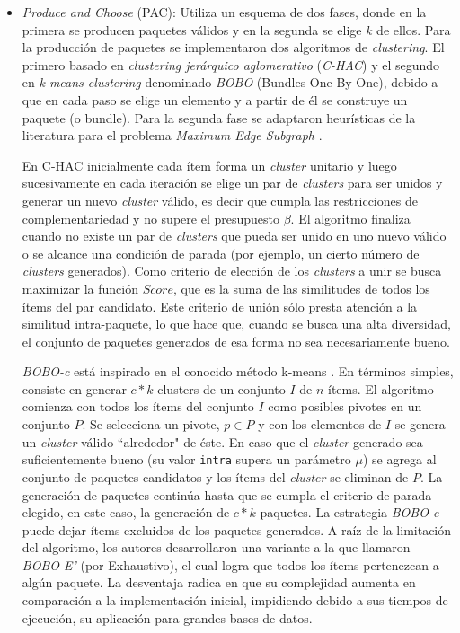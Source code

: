 \begin{itemize}

	\item {\em Produce and Choose} (PAC): Utiliza un esquema de dos fases, donde en la primera se producen paquetes válidos y en la segunda se elige $k$ de ellos. Para la producción de paquetes se implementaron dos algoritmos de {\em clustering}. El primero basado en {\em clustering jerárquico aglomerativo} (\textit{C-HAC}) y el segundo en {\em k-means clustering} denominado \textit{BOBO} (Bundles One-By-One), debido a que en cada paso se elige un elemento y a partir de él se construye un paquete (o bundle). Para la segunda fase se adaptaron heurísticas de la literatura para el problema {\em Maximum Edge Subgraph} \cite{finding_maximum_density_subgraph}.

En C-HAC inicialmente cada ítem forma un {\em cluster} unitario y luego sucesivamente en cada iteración se elige un par de {\em clusters} para ser unidos y generar un nuevo {\em cluster} válido, es decir que cumpla las restricciones de complementariedad y no supere el presupuesto $\beta$. El algoritmo finaliza cuando no existe un par de {\em clusters} que pueda ser unido en uno nuevo válido o se alcance una condición de parada (por ejemplo, un cierto número de {\em clusters} generados). Como criterio de elección de los {\em clusters} a unir se busca maximizar la función $Score$, que es la suma de las similitudes de todos los ítems del par candidato. Este criterio de unión sólo presta atención a la similitud intra-paquete, lo que hace que, cuando se busca una alta diversidad, el conjunto de paquetes generados de esa forma no sea necesariamente bueno.

{\em BOBO-c} está inspirado en el conocido método k-means \cite{forgy65}. En términos simples, consiste en generar $c*k$ clusters de un conjunto $I$ de $n$ ítems. El algoritmo comienza con todos los ítems del conjunto $I$ como posibles pivotes en un conjunto $P$. Se selecciona un pivote, $p \in P$ y con los elementos de $I$ se genera un {\em cluster} válido ``alrededor" de éste. En caso que el {\em cluster} generado sea suficientemente bueno (su valor \texttt{intra} supera un parámetro $\mu$) se agrega al conjunto de paquetes candidatos y los ítems del {\em cluster} se eliminan de $P$. La generación de paquetes continúa hasta que se cumpla el criterio de parada elegido, en este caso, la generación de $c*k$ paquetes. La estrategia \textit{BOBO-c} puede dejar ítems excluidos de los paquetes generados. A raíz de la limitación del algoritmo, los autores desarrollaron una variante a la que llamaron \textit{BOBO-E'} (por Exhaustivo), el cual logra que todos los ítems pertenezcan a algún paquete. La desventaja radica en que su complejidad aumenta en comparación a la implementación inicial, impidiendo debido a sus tiempos de ejecución, su aplicación para grandes bases de datos.


\end{itemize}
